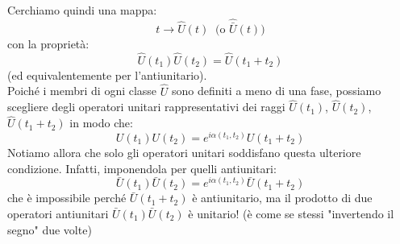 \documentclass[../../FisicaTeorica.tex]{subfiles}
\begin{document}
Cerchiamo quindi una mappa:
\[
t\to \hat{U}(t)\> \text{ (o $\widehat{\bar{U}}(t)$)}
\]
con la proprietà:
\[
\hat{U}\left(t_1\right)\hat{U}\left(t_2\right)=\hat{U}\left(t_1+t_2\right)
\]
(ed equivalentemente per l'antiunitario).\\
Poiché i membri di ogni classe $\hat{U}$ sono definiti a meno di una fase, possiamo scegliere degli operatori unitari rappresentativi dei raggi $\hat{U}\left(t_1\right)$, $\hat{U}\left(t_2\right)$, $\hat{U}\left(t_1+t_2\right)$ in modo che:
\[
U\left(t_1\right)U\left(t_2\right)=e^{i\alpha\left(t_1,t_2\right)}U\left(t_1+t_2\right)
\]
Notiamo allora che solo gli operatori unitari soddisfano questa ulteriore condizione. Infatti, imponendola per quelli antiunitari:
\[
\bar{U}\left(t_1\right)\bar{U}\left(t_2\right)=e^{i\alpha\left(t_1,t_2\right)}\bar{U}\left(t_1+t_2\right)
\]
che è impossibile perché $\bar{U}\left(t_1+t_2\right)$ è antiunitario, ma il prodotto di due operatori antiunitari $\bar{U}\left(t_1\right)\bar{U}\left(t_2\right)$ è unitario! (è come se stessi "invertendo il segno" due volte) %
\end{document}
